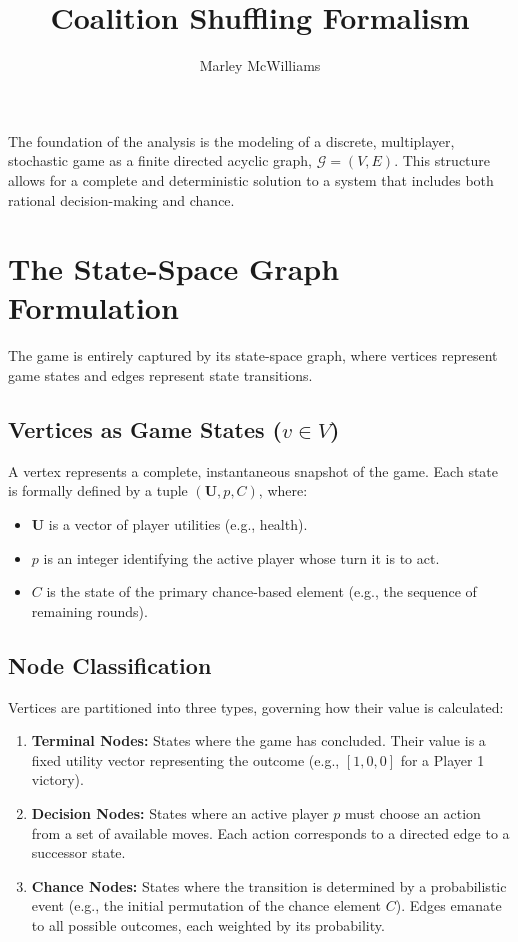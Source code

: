 \documentclass{article}
\title{Coalition Shuffling Formalism}
\author{Marley McWilliams}
\begin{document}
\maketitle
The foundation of the analysis is the modeling of a discrete, multiplayer, stochastic game as a finite directed acyclic graph, $\mathcal{G} = (V, E)$. This structure allows for a complete and deterministic solution to a system that includes both rational decision-making and chance.

\section{The State-Space Graph Formulation}

The game is entirely captured by its state-space graph, where vertices represent game states and edges represent state transitions.

\subsection{Vertices as Game States ($v \in V$)}
A vertex represents a complete, instantaneous snapshot of the game. Each state is formally defined by a tuple $(\mathbf{U}, p, C)$, where:
\begin{itemize}
    \item $\mathbf{U}$ is a vector of player utilities (e.g., health).
    \item $p$ is an integer identifying the active player whose turn it is to act.
    \item $C$ is the state of the primary chance-based element (e.g., the sequence of remaining rounds).
\end{itemize}

\subsection{Node Classification}
Vertices are partitioned into three types, governing how their value is calculated:
\begin{enumerate}
    \item \textbf{Terminal Nodes:} States where the game has concluded. Their value is a fixed utility vector representing the outcome (e.g., $[1, 0, 0]$ for a Player 1 victory).
    \item \textbf{Decision Nodes:} States where an active player $p$ must choose an action from a set of available moves. Each action corresponds to a directed edge to a successor state.
    \item \textbf{Chance Nodes:} States where the transition is determined by a probabilistic event (e.g., the initial permutation of the chance element $C$). Edges emanate to all possible outcomes, each weighted by its probability.
\end{enumerate}
\end{document}

